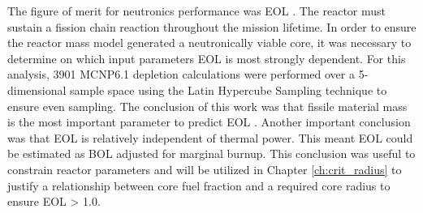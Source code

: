 The figure of merit for neutronics performance was EOL \keff. The reactor must
sustain a fission chain reaction throughout the mission lifetime. In order to
ensure the reactor mass model generated a neutronically viable core, it was
necessary to determine on which input parameters EOL \keff is most strongly
dependent. For this analysis, 3901 MCNP6.1 depletion calculations were
performed over a 5-dimensional sample space using the Latin Hypercube Sampling
technique to ensure even sampling. The conclusion of this work was that fissile
material mass is the most important parameter to predict EOL \keff. Another
important conclusion was that EOL \keff is relatively independent of thermal power. This
meant EOL \keff could be estimated as BOL \keff adjusted for marginal burnup.
This conclusion was useful to constrain reactor parameters and will be utilized
in Chapter \ref{ch:crit_radius} to justify a relationship between core fuel fraction
and a required core radius to ensure EOL \keff > 1.0.

